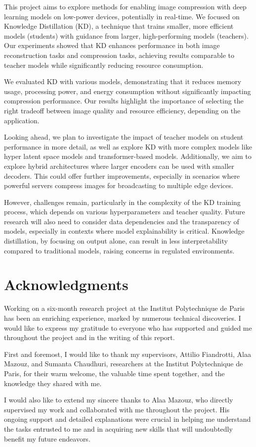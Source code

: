 \documentclass{article}
\begin{document}
This project aims to explore methods for enabling image compression with deep learning models on low-power devices, potentially in real-time. We focused on Knowledge Distillation (KD), a technique that trains smaller, more efficient models (students) with guidance from larger, high-performing models (teachers). Our experiments showed that KD enhances performance in both image reconstruction tasks and compression tasks, achieving results comparable to teacher models while significantly reducing resource consumption.

We evaluated KD with various models, demonstrating that it reduces memory usage, processing power, and energy consumption without significantly impacting compression performance. Our results highlight the importance of selecting the right tradeoff between image quality and resource efficiency, depending on the application.

Looking ahead, we plan to investigate the impact of teacher models on student performance in more detail, as well as explore KD with more complex models like hyper latent space models and transformer-based models. Additionally, we aim to explore hybrid architectures where larger encoders can be used with smaller decoders. This could offer further improvements, especially in scenarios where powerful servers compress images for broadcasting to multiple edge devices.

However, challenges remain, particularly in the complexity of the KD training process, which depends on various hyperparameters and teacher quality. Future research will also need to consider data dependencies and the transparency of models, especially in contexts where model explainability is critical. Knowledge distillation, by focusing on output alone, can result in less interpretability compared to traditional models, raising concerns in regulated environments.

\section*{Acknowledgments}
Working on a six-month research project at the Institut Polytechnique de Paris has been an enriching experience, marked by numerous technical discoveries. I would like to express my gratitude to everyone who has supported and guided me throughout the project and in the writing of this report.

First and foremost, I would like to thank my supervisors, Attilio Fiandrotti, Alaa Mazouz, and Sumanta Chaudhuri, researchers at the Institut Polytechnique de Paris, for their warm welcome, the valuable time spent together, and the knowledge they shared with me.

I would also like to extend my sincere thanks to Alaa Mazouz, who directly supervised my work and collaborated with me throughout the project. His ongoing support and detailed explanations were crucial in helping me understand the tasks entrusted to me and in acquiring new skills that will undoubtedly benefit my future endeavors.

  
  
\end{document}

